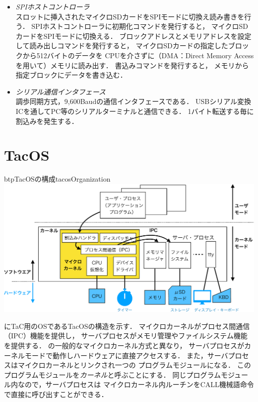 \begin{itemize}
  80文字×24行の文字をVGAディスプレイに表示する．
  メモリ空間の\|E000h|から配置されるVRAMに書き込んだ
  ASCIIコードと対応する文字をディスプレイに表示する．
  \|E000h|番地がディスプレイの左上隅に対応する，
  \|E001h|番地が一行目の2文字の位置，
  \|E04Fh|番地が一行目の80文字の位置，
  \|E050h|番地が二行目の1文字の位置に対応する．
\item \emph{SPIホストコントローラ} \\
  スロットに挿入されたマイクロSDカードをSPIモードに切換え読み書きを行う．
  SPIホストコントローラに初期化コマンドを発行すると，
  マイクロSDカードをSPIモードに切換える．
  ブロックアドレスとメモリアドレスを設定して読み出しコマンドを発行すると，
  マイクロSDカードの指定したブロックから512バイトのデータを
  CPUを介さずに（DMA：Direct Memory Accessを用いて）メモリに読み出す．
  書込みコマンドを発行すると，
  メモリから指定ブロックにデータを書き込む．
\item \emph{シリアル通信インタフェース} \\
  調歩同期方式，9,600Baudの通信インタフェースである．
  USBシリアル変換ICを通してPC等のシリアルターミナルと通信できる．
  1バイト転送する毎に割込みを発生する．
\end{itemize}

\section{TacOS}
\begin{myfig}{btp}{TacOSの構成}{tacosOrganization}
  \includegraphics[scale=0.66]{Fig/tacosOrganization-crop.pdf}
\end{myfig}

にTaC用のOSであるTacOSの構造を示す．
マイクロカーネルがプロセス間通信（IPC）機能を提供し，
サーバプロセスがメモリ管理やファイルシステム機能を提供する．
の一般的なマイクロカーネル方式と異なり，
サーバプロセスがカーネルモードで動作しハードウェアに直接アクセスする．
また，サーバプロセスはマイクロカーネルとリンクされ一つの
プログラムモジュールになる．
このプログラムモジュールを\emph{カーネル}と呼ぶことにする．
同じプログラムモジュール内なので，サーバプロセスは
マイクロカーネル内ルーチンをCALL機械語命令で直接に呼び出すことができる．

